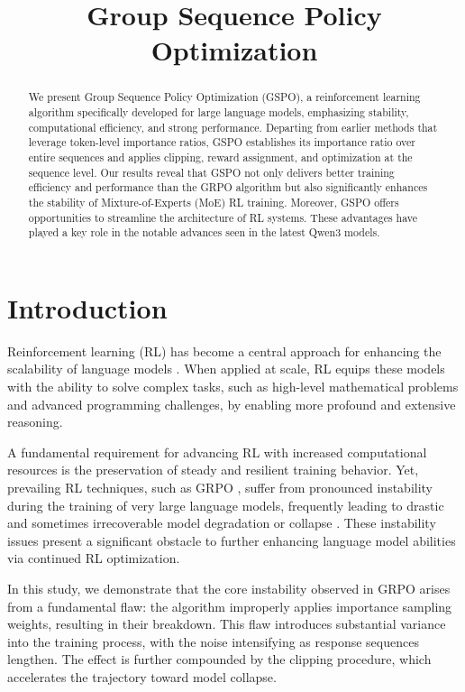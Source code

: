 \title{Group Sequence Policy Optimization}

\begin{abstract}
We present Group Sequence Policy Optimization (GSPO), a reinforcement learning algorithm specifically developed for large language models, emphasizing stability, computational efficiency, and strong performance. Departing from earlier methods that leverage token-level importance ratios, GSPO establishes its importance ratio over entire sequences and applies clipping, reward assignment, and optimization at the sequence level. Our results reveal that GSPO not only delivers better training efficiency and performance than the GRPO algorithm but also significantly enhances the stability of Mixture-of-Experts (MoE) RL training. Moreover, GSPO offers opportunities to streamline the architecture of RL systems. These advantages have played a key role in the notable advances seen in the latest Qwen3 models.
\end{abstract}

\section{Introduction}
\label{sec:intro}

Reinforcement learning (RL) has become a central approach for enhancing the scalability of language models \citep{o1,dpsk-r1,qwq32b,qwen3}. When applied at scale, RL equips these models with the ability to solve complex tasks, such as high-level mathematical problems and advanced programming challenges, by enabling more profound and extensive reasoning.

A fundamental requirement for advancing RL with increased computational resources is the preservation of steady and resilient training behavior. Yet, prevailing RL techniques, such as GRPO \citep{grpo}, suffer from pronounced instability during the training of very large language models, frequently leading to drastic and sometimes irrecoverable model degradation or collapse \citep{qwen3, minimax-m1}. These instability issues present a significant obstacle to further enhancing language model abilities via continued RL optimization.

In this study, we demonstrate that the core instability observed in GRPO arises from a fundamental flaw: the algorithm improperly applies importance sampling weights, resulting in their breakdown. This flaw introduces substantial variance into the training process, with the noise intensifying as response sequences lengthen. The effect is further compounded by the clipping procedure, which accelerates the trajectory toward model collapse.

